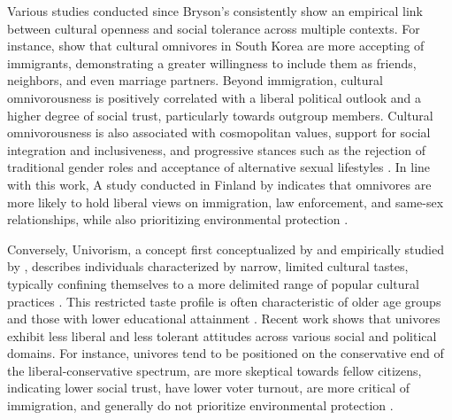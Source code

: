 \documentclass[12pt]{article}
\begin{document}
Various studies conducted since Bryson's consistently show an empirical link between cultural openness and social tolerance across multiple contexts. For instance, \citet{cho2023are-61e} show that cultural omnivores in South Korea are more accepting of immigrants, demonstrating a greater willingness to include them as friends, neighbors, and even marriage partners. Beyond immigration, cultural omnivorousness is positively correlated with a liberal political outlook and a higher degree of social trust, particularly towards outgroup members. Cultural omnivorousness is also associated with cosmopolitan values, support for social integration and inclusiveness, and progressive stances such as the rejection of traditional gender roles and acceptance of alternative sexual lifestyles \citep{chan2019understanding-1d0}. In line with this work, A study conducted in Finland by \citet{lindblom2022growing-ded} indicates that omnivores are more likely to hold liberal views on immigration, law enforcement, and same-sex relationships, while also prioritizing environmental protection \citep{lindblom2022growing-ded}. 

Conversely, Univorism, a concept first conceptualized by \citet{peterson1992understanding-ce3} and empirically studied by \citet{bryson1997what-933}, describes individuals characterized by narrow, limited cultural tastes, typically confining themselves to a more delimited range of popular cultural practices \citep{lindblom2022growing-ded, cho2023are-61e}. This restricted taste profile is often characteristic of older age groups and those with lower educational attainment \citep{sokolova2020does-65c, lindblom2019anything-530}. Recent work shows that univores exhibit less liberal and less tolerant attitudes across various social and political domains. For instance, univores tend to be positioned on the conservative end of the liberal-conservative spectrum, are more skeptical towards fellow citizens, indicating lower social trust,  have lower voter turnout, are more critical of immigration, and generally do not prioritize environmental protection \citep{lindblom2022growing-ded, cho2023are-61e, chan2019understanding-1d0}. 
\end{document}
